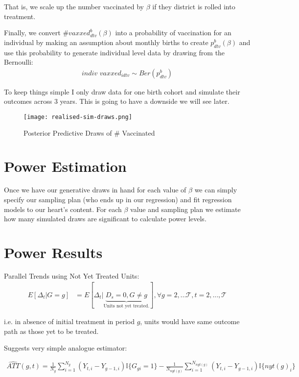 \documentclass{article}
\begin{document}
That is, we scale up the number vaccinated by $\beta$ if they district is rolled 
into treatment.

Finally, we convert $\# vaxxed_{dtv}^b(\beta)$ into a probability of vaccination 
for an individual by making an assumption about monthly births to create $p_{dtv}^b(\beta)$ 
and use this probability to generate individual level data by drawing from the 
Bernoulli:
\begin{align*}
\textit{indiv vaxxed}_{idtv} \sim Ber(p^b_{dtv})
\end{align*} 


To keep things simple I only draw data for one birth cohort and simulate their 
outcomes across 3 years. This is going to have a downside we will see later.

\begin{figure}[htbp]
    \centering
   \texttt{[image: realised-sim-draws.png]} 
    \caption{Posterior Predictive Draws of \# Vaccinated}
    \label{fig:pp}
\end{figure}


\section*{Power Estimation}


Once we have our generative draws in hand for each value of $\beta$ we can simply 
specify our sampling plan (who ends up in our regression) and fit regression models 
to our heart's content. For each $\beta$ value and sampling plan we estimate how many simulated draws 
are significant to calculate power levels.


\section*{Power Results}

    Parallel Trends using Not Yet Treated Units:
    \begin{align*}
        E\left[\Delta_t | G = g\right] &= 
        E\left[
            \Delta_t | \underbrace{D_s = 0, G \neq g}_\text{Units not yet treated.} 
        \right], \forall g = 2, ... \mathcal{T}, t = 2, ..., \mathcal{T}
    \end{align*}

    i.e. in absence of initial treatment in period $g$, units would 
    have same outcome path as those yet to be treated. 





    Suggests very simple analogue estimator:

    \begin{align*}
       \hat{ATT}(g,t) = \frac{1}{N_g} \sum_{i=1}^{N_g}  (Y_{t,i} - Y_{g-1,i}) \mathbb{I}\{G_{gi} = 1\} -
       \frac{1}{N_{nyt(g)}} \sum_{i=1}^{N_{nyt(g)}} (Y_{t,i} - Y_{g-1,i})\mathbb{I}\{nyt(g)_i\} 
    \end{align*}
\end{document}
